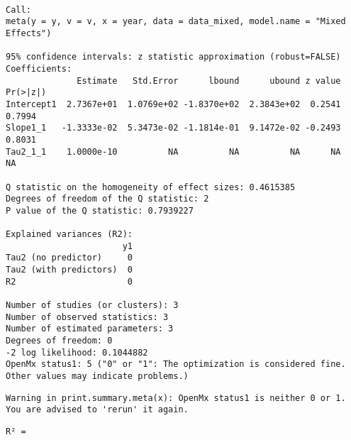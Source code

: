 \documentclass[
  letterpaper,
  DIV=11,
  numbers=noendperiod]{scrartcl}
\newenvironment{Shaded}{\begin{snugshade}}{\end{snugshade}}
\newcommand{\AttributeTok}[1]{\textcolor[rgb]{0.40,0.45,0.13}{#1}}
\newcommand{\CommentTok}[1]{\textcolor[rgb]{0.37,0.37,0.37}{#1}}
\newcommand{\DecValTok}[1]{\textcolor[rgb]{0.68,0.00,0.00}{#1}}
\newcommand{\FunctionTok}[1]{\textcolor[rgb]{0.28,0.35,0.67}{#1}}
\newcommand{\NormalTok}[1]{\textcolor[rgb]{0.00,0.23,0.31}{#1}}
\newcommand{\OtherTok}[1]{\textcolor[rgb]{0.00,0.23,0.31}{#1}}
\newcommand{\SpecialCharTok}[1]{\textcolor[rgb]{0.37,0.37,0.37}{#1}}
\newcommand{\StringTok}[1]{\textcolor[rgb]{0.13,0.47,0.30}{#1}}
\begin{document}
\begin{verbatim}

Call:
meta(y = y, v = v, x = year, data = data_mixed, model.name = "Mixed Effects")

95% confidence intervals: z statistic approximation (robust=FALSE)
Coefficients:
              Estimate   Std.Error      lbound      ubound z value Pr(>|z|)
Intercept1  2.7367e+01  1.0769e+02 -1.8370e+02  2.3843e+02  0.2541   0.7994
Slope1_1   -1.3333e-02  5.3473e-02 -1.1814e-01  9.1472e-02 -0.2493   0.8031
Tau2_1_1    1.0000e-10          NA          NA          NA      NA       NA

Q statistic on the homogeneity of effect sizes: 0.4615385
Degrees of freedom of the Q statistic: 2
P value of the Q statistic: 0.7939227

Explained variances (R2):
                       y1
Tau2 (no predictor)     0
Tau2 (with predictors)  0
R2                      0

Number of studies (or clusters): 3
Number of observed statistics: 3
Number of estimated parameters: 3
Degrees of freedom: 0
-2 log likelihood: 0.1044882 
OpenMx status1: 5 ("0" or "1": The optimization is considered fine.
Other values may indicate problems.)
\end{verbatim}

\begin{verbatim}
Warning in print.summary.meta(x): OpenMx status1 is neither 0 or 1. You are advised to 'rerun' it again.
\end{verbatim}

\begin{Shaded}
\end{Shaded}

\begin{verbatim}
R² = 
\end{verbatim}
\end{document}
